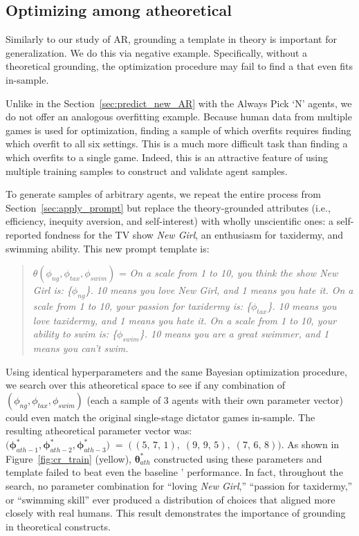 \subsection{Optimizing among atheoretical }
\label{sec:atheory_prompt}

Similarly to our study of AR, grounding a \persona{} template in theory is important for generalization.
We do this via negative example.
Specifically, without a theoretical grounding, the optimization procedure may fail to find a \persona{} that even fits in-sample.

Unlike in the Section~\ref{sec:predict_new_AR} with the Always Pick `N' agents, we do not offer an analogous overfitting example.
Because human data from multiple games is used for optimization, finding a sample of  which overfits requires finding  which overfit to all six settings.
This is a much more difficult task than finding a \persona{} which overfits to a single game.
Indeed, this is an attractive feature of using multiple training samples to construct and validate agent samples.

To generate samples of arbitrary agents, we repeat the entire process from Section~\ref{sec:apply_prompt} but replace the theory-grounded attributes (i.e., efficiency, inequity aversion, and self-interest) with wholly unscientific ones: a self-reported fondness for the TV show \emph{New Girl}, an enthusiasm for taxidermy, and swimming ability.  
This new prompt template is:
\begin{quote}
\vspace{-.5cm}
\singlespacing
$\theta(\phi_{ng}, \phi_{tax}, \phi_{swim})$ = \textit{On a scale from 1 to 10, you think the show New Girl is: \{$\phi_{ng}$\}.
10 means you love New Girl, and 1 means you hate it.
On a scale from 1 to 10, your passion for taxidermy is: \{\(\phi_{tax}\)\}.
10 means you love taxidermy, and 1 means you hate it.
On a scale from 1 to 10, your ability to swim is: \{\(\phi_{swim}\)\}.
10 means you are a great swimmer, and 1 means you can't swim.}
\end{quote}

Using identical hyperparameters and the same Bayesian optimization procedure, we search over this atheoretical space to see if any combination of $(\phi_{ng}, \phi_{tax}, \phi_{swim})$ (each a sample of 3 agents with their own parameter vector) could even match the original single-stage dictator games in-sample.  
The resulting atheoretical parameter vector was: $\bigl(\bm{\phi}_{ath-1}^*,\bm{\phi}_{ath-2}^*,\bm{\phi}_{ath-3}^*\bigr) \;=\; \bigl(\,(5,\,7,\,1),\;(9,\,9,\,5),\;(7,\,6,\,8)\bigr)$.
As shown in Figure~\ref{fig:cr_train} (yellow), $\bm{\theta}_{ath}^*$ constructed using these parameters and template failed to beat even the baseline ' performance.  
In fact, throughout the search, no parameter combination for ``loving \emph{New Girl},'' ``passion for taxidermy,'' or ``swimming skill'' ever produced a distribution of choices that aligned more closely with real humans.
This result demonstrates the importance of grounding  in theoretical constructs.

